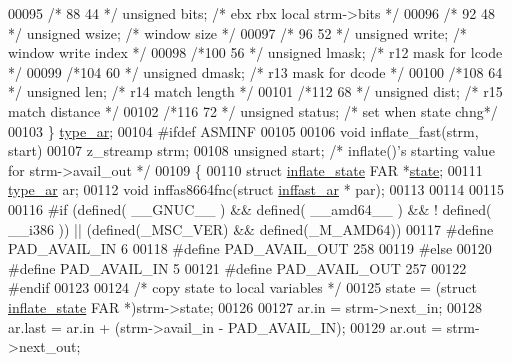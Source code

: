 \begin{DoxyCode}
{{00095 \textcolor{comment}{/* 88   44 */} \textcolor{keywordtype}{unsigned} bits;            \textcolor{comment}{/* ebx rbx  local strm->bits */}
00096 \textcolor{comment}{/* 92   48 */} \textcolor{keywordtype}{unsigned} wsize;           \textcolor{comment}{/*          window size */}
00097 \textcolor{comment}{/* 96   52 */} \textcolor{keywordtype}{unsigned} write;           \textcolor{comment}{/*          window write index */}
00098 \textcolor{comment}{/*100   56 */} \textcolor{keywordtype}{unsigned} lmask;           \textcolor{comment}{/*     r12  mask for lcode */}
00099 \textcolor{comment}{/*104   60 */} \textcolor{keywordtype}{unsigned} dmask;           \textcolor{comment}{/*     r13  mask for dcode */}
00100 \textcolor{comment}{/*108   64 */} \textcolor{keywordtype}{unsigned} len;             \textcolor{comment}{/*     r14  match length */}
00101 \textcolor{comment}{/*112   68 */} \textcolor{keywordtype}{unsigned} dist;            \textcolor{comment}{/*     r15  match distance */}
00102 \textcolor{comment}{/*116   72 */} \textcolor{keywordtype}{unsigned} status;          \textcolor{comment}{/*          set when state chng*/}
00103     \} \hyperlink{structinffast__ar}{type\_ar};
00104 \textcolor{preprocessor}{#ifdef ASMINF}
00105 
00106 \textcolor{keywordtype}{void} inflate\_fast(strm, start)
00107 z\_streamp strm;
00108 \textcolor{keywordtype}{unsigned} start;         \textcolor{comment}{/* inflate()'s starting value for strm->avail\_out */}
00109 \{
00110     \textcolor{keyword}{struct }\hyperlink{structinflate__state}{inflate\_state} FAR *\hyperlink{structstate}{state};
00111     \hyperlink{structinffast__ar}{type\_ar} ar;
00112     \textcolor{keywordtype}{void} inffas8664fnc(\textcolor{keyword}{struct} \hyperlink{structinffast__ar}{inffast\_ar} * par);
00113 
00114 
00115 
00116 \textcolor{preprocessor}{#if (defined( \_\_GNUC\_\_ ) && defined( \_\_amd64\_\_ ) && ! defined( \_\_i386 )) || (defined(\_MSC\_VER) &&
       defined(\_M\_AMD64))}
00117 \textcolor{preprocessor}{#define PAD\_AVAIL\_IN 6}
00118 \textcolor{preprocessor}{#define PAD\_AVAIL\_OUT 258}
00119 \textcolor{preprocessor}{#else}
00120 \textcolor{preprocessor}{#define PAD\_AVAIL\_IN 5}
00121 \textcolor{preprocessor}{#define PAD\_AVAIL\_OUT 257}
00122 \textcolor{preprocessor}{#endif}
00123 
00124     \textcolor{comment}{/* copy state to local variables */}
00125     state = (\textcolor{keyword}{struct }\hyperlink{structinflate__state}{inflate\_state} FAR *)strm->state;
00126 
00127     ar.in = strm->next\_in;
00128     ar.last = ar.in + (strm->avail\_in - PAD\_AVAIL\_IN);
00129     ar.out = strm->next\_out;
}}
\end{DoxyCode}

